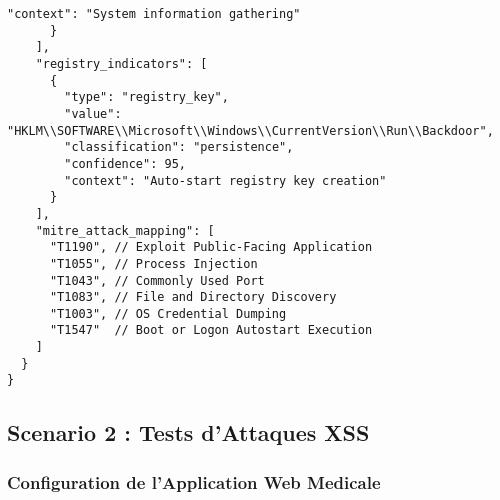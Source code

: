 \begin{lstlisting}[style=jsonstyle,caption=IOCs extraits du test EternalBlue]
        "context": "System information gathering"
      }
    ],
    "registry_indicators": [
      {
        "type": "registry_key",
        "value": "HKLM\\SOFTWARE\\Microsoft\\Windows\\CurrentVersion\\Run\\Backdoor",
        "classification": "persistence",
        "confidence": 95,
        "context": "Auto-start registry key creation"
      }
    ],
    "mitre_attack_mapping": [
      "T1190", // Exploit Public-Facing Application
      "T1055", // Process Injection  
      "T1043", // Commonly Used Port
      "T1083", // File and Directory Discovery
      "T1003", // OS Credential Dumping
      "T1547"  // Boot or Logon Autostart Execution
    ]
  }
}
\end{lstlisting}

\subsection{Scenario 2 : Tests d'Attaques XSS}

\subsubsection{Configuration de l'Application Web Medicale}

